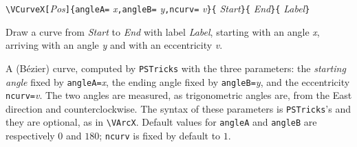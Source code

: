 \documentclass[11pt,twoside]{article}
\newlength{\ColoText}%
\newlength{\ColoFigu}%
\newlength{\parindenttemp} %
\newcommand{\noi}{\noindent}
\newlength{\jsIndent}%
\newcommand{\PSTricks}{\texttt{PSTricks}\xspace}
\begin{document}
\noi 
\hspace*{-\jsIndent}
\begin{minipage}[c]{\ColoText+12em}
        \par\vspace*{0mm}%
        \footnotesize
\verb+\VCurveX[+\textsl{Pos}\verb+]{angleA=+%
   \textsl{x}\verb+,angleB=+%
   \textsl{y}\verb+,ncurv=+%
   \textsl{v}\verb+}{+%
   \textsl{Start}\verb+}{+%
   \textsl{End}\verb+}{+%
   \textsl{Label}\verb+}+
   
\end{minipage}%
\hspace*{1.2em}%
\begin{minipage}[c]{\ColoFigu-12em}%
\par\vspace*{0mm}%
Draw a curve from \textsl{Start} to \textsl{End} with label 
\textsl{Label}, starting with an angle \textsl{x}, arriving with an 
angle \textsl{y} and with an eccentricity \textsl{v}.
\end{minipage}%

\medskip
\noi
A (B\'ezier) curve, computed by \PSTricks with the three parameters:
the \emph{starting angle} fixed by \verb+angleA=+\textsl{x}, the 
ending angle fixed by \verb+angleB=+\textsl{y}, and the eccentricity 
\verb+ncurv=+\textsl{v}.
The two angles are measured, as trigonometric angles are, from
the East direction and counterclockwise. 
The syntax of these parameters is \PSTricks's and they are optional, 
as in \verb+\VArcX+.
Default values for \verb+angleA+
and \verb+angleB+ are respectively $0$ and $180$; \verb+ncurv+ is fixed
by default to $1$.
\end{document}
